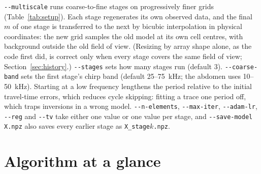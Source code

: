 \documentclass[11pt]{article}
\newcommand{\code}[1]{\texttt{#1}}
\begin{document}
\code{-{}-multiscale} runs coarse-to-fine stages on progressively finer grids
(Table~\ref{tab:setup}). Each stage regenerates its own observed data, and the
final $m$ of one stage is transferred to the next by bicubic interpolation in
physical coordinates: the new grid samples the old model at its own cell
centres, with background outside the old field of view. (Resizing by array
shape alone, as the code first did, is correct only when every stage covers
the same field of view; Section~\ref{sec:history}.) \code{-{}-stages} sets how
many stages run (default 3). \code{-{}-coarse-band} sets the first stage's
chirp band (default 25--75~kHz; the abdomen uses 10--50~kHz). Starting at a low
frequency lengthens the period relative to the initial travel-time errors,
which reduces cycle skipping: fitting a trace one period off, which traps
inversions in a wrong model. \code{-{}-n-elements}, \code{-{}-max-iter},
\code{-{}-adam-lr}, \code{-{}-reg} and \code{-{}-tv} take either one value or
one value per stage, and \code{-{}-save-model X.npz} also saves every earlier
stage as \code{X\_stage$k$.npz}.

\section{Algorithm at a glance}
\end{document}
